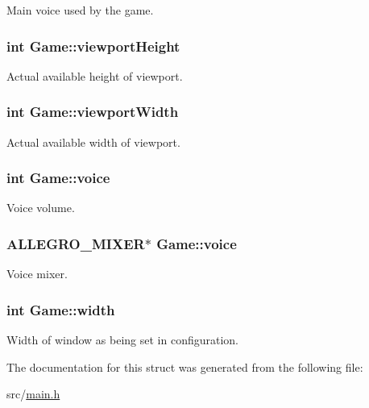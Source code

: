 Main voice used by the game. \hypertarget{structGame_a3e8d2e824fc4de63e936c4b0bcf071f3}{
\subsubsection[{viewport\-Height}]{\setlength{\rightskip}{0pt plus 5cm}int Game\-::viewport\-Height}}\label{structGame_a3e8d2e824fc4de63e936c4b0bcf071f3}
Actual available height of viewport. \hypertarget{structGame_aea50dd6aa55c0d5bbd42dcb38e433a71}{
\subsubsection[{viewport\-Width}]{\setlength{\rightskip}{0pt plus 5cm}int Game\-::viewport\-Width}}\label{structGame_aea50dd6aa55c0d5bbd42dcb38e433a71}
Actual available width of viewport. \hypertarget{structGame_a5523ac4fdb8fdbd2e86b58a3fbc2e6d0}{
\subsubsection[{voice}]{\setlength{\rightskip}{0pt plus 5cm}int Game\-::voice}}\label{structGame_a5523ac4fdb8fdbd2e86b58a3fbc2e6d0}
Voice volume. \hypertarget{structGame_acc651129cb9fafedf0588e229827c543}{
\subsubsection[{voice}]{\setlength{\rightskip}{0pt plus 5cm}A\-L\-L\-E\-G\-R\-O\-\_\-\-M\-I\-X\-E\-R$\ast$ Game\-::voice}}\label{structGame_acc651129cb9fafedf0588e229827c543}
Voice mixer. \hypertarget{structGame_a06b5a675d7c0f6a9b58d395872b1a4e7}{
\subsubsection[{width}]{\setlength{\rightskip}{0pt plus 5cm}int Game\-::width}}\label{structGame_a06b5a675d7c0f6a9b58d395872b1a4e7}
Width of window as being set in configuration. 

The documentation for this struct was generated from the following file\-:\begin{DoxyCompactItemize}
\item 
src/\hyperlink{main_8h}{main.\-h}\end{DoxyCompactItemize}
